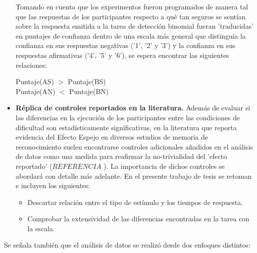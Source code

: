 \begin{itemize}
Tomando en cuenta que los experimentos fueron programados de manera tal que las respuestas de los participantes respecto a qué tan seguros se sentían sobre la respuesta emitida a la tarea de detección binomial fueran 'traducidas' en puntajes de confianza dentro de una escala más general que distinguía la confianza en sus respuestas negativas ('1', '2' y '3') y la confianza en sus respuestas afirmativas ('4', '5' y '6'), se espera encontrar las siguientes relaciones: \\
\begin{center}
Puntaje(AS) $>$ Puntaje(BS)\\
Puntaje(AN) $<$ Puntaje(BN)\\
\end{center}

\item \textbf{Réplica de controles reportados en la literatura.}
Además de evaluar si las diferencias en la ejecución de los participantes entre las condiciones de dificultad son estadísticamente significativas, en la literatura que reporta evidencia del Efecto Espejo en diversos estudios de memoria de reconocimiento suelen encontrarse controles adicionales añadidos en el análisis de datos como una medida para reafirmar la no-trivialidad del 'efecto reportado' ($REFERENCIA$ ). La importancia de dichos controles se abordará con detalle más adelante. En el presente trabajo de tesis se retoman e incluyen los siguientes:
	\begin{itemize}
	\item Descartar relación entre el tipo de estímulo y los tiempos de respuesta.
	\item Comprobar la extensividad de las diferencias encontradas en la tarea con la escala.
	\end{itemize}
\end{itemize}






Se señala también que el análisis de datos se realizó desde dos enfoques distintos:

